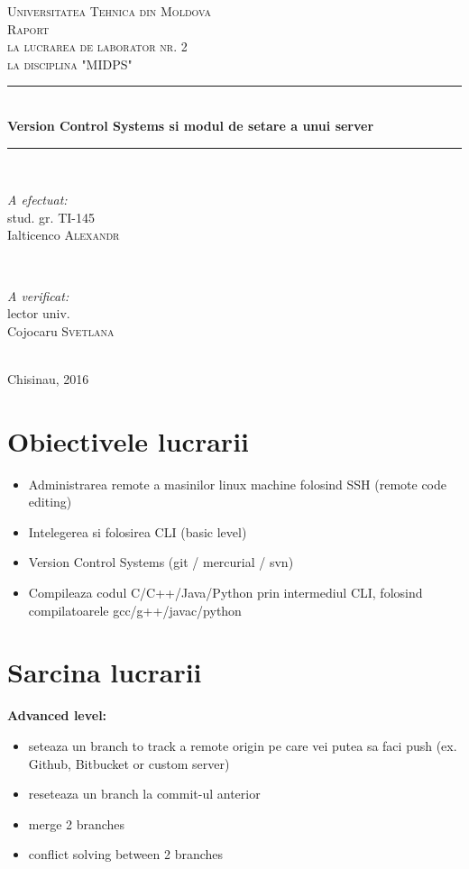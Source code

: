 \documentclass[12pt]{article}
\begin{document}
\begin{titlepage}

\newcommand{\HRule}{\rule{\linewidth}{0.5mm}}

\center 
\textsc{\LARGE Universitatea Tehnica din Moldova}\\[1.5cm] \textsc{\Large Raport}\\[0.5cm] 
\textsc{\large la lucrarea de laborator nr. 2 \\la disciplina "MIDPS"}\\[0.5cm]
\HRule \\[0.4cm]
{ \huge \bfseries Version Control Systems si modul de setare a unui server}\\[0.4cm]
\HRule \\[1.5cm]
\begin{minipage}{0.4\textwidth}
\begin{flushleft} \large
\emph{A efectuat:}\\
stud. gr. TI-145\\
Ialticenco \textsc{Alexandr}
\end{flushleft}
\end{minipage}
~
\begin{minipage}{0.4\textwidth}
\begin{flushright} \large
\emph{A verificat:} \\
lector univ.\\
Cojocaru \textsc{Svetlana}
\end{flushright}
\end{minipage}\\[4cm]
\vfill 
{\large Chisinau, 2016}\\[10cm] 
\end{titlepage}
\section*{Obiectivele lucrarii}
\begin{itemize}
\item Administrarea remote a masinilor linux machine folosind SSH (remote code editing)
\item Intelegerea si folosirea CLI (basic level)
\item Version Control Systems (git / mercurial / svn)
\item Compileaza codul C/C++/Java/Python prin intermediul CLI, folosind compilatoarele gcc/g++/javac/python
\end{itemize}

\section* {Sarcina lucrarii}
\textbf{Advanced level:}
\begin{itemize}
\item seteaza un branch to track a remote origin pe care vei putea sa faci push (ex. Github, Bitbucket or custom server)
\item reseteaza un branch la commit-ul anterior
\item 	merge 2 branches
\item 	conflict solving between 2 branches
\end{itemize}
\end{document}
